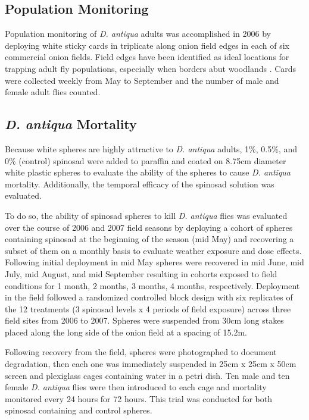 \documentclass[num-refs]{wiley-article}
\begin{document}
\subsection{Population Monitoring}

Population monitoring of \textit{D. antiqua} adults was accomplished in 2006 by deploying white sticky cards in triplicate along onion field edges in each of six commercial onion fields.  Field edges have been identified as ideal locations for trapping adult fly populations, especially when borders abut woodlands \citep{werling2006spatial}.  Cards were collected weekly from May to September and the number of male and female adult flies counted.

\subsection{\textit{D. antiqua} Mortality}

Because white spheres are highly attractive to \textit{D. antiqua} adults, 1\%, 0.5\%, and 0\% (control) spinosad were added to paraffin and coated on 8.75cm diameter white plastic spheres to evaluate the ability of the spheres to cause \textit{D. antiqua} mortality. Additionally, the temporal efficacy of the spinosad solution was evaluated.

To do so, the ability of spinosad spheres to kill \textit{D. antiqua} flies was evaluated over the course of 2006 and 2007 field seasons by deploying a cohort of spheres containing spinosad at the beginning of the season (mid May) and recovering a subset of them on a monthly basis to evaluate weather exposure and dose effects.  Following initial deployment in mid May spheres were recovered in mid June, mid July, mid August, and mid September resulting in cohorts exposed to field conditions for 1 month, 2 months, 3 months, 4 months, respectively. Deployment in the field followed a randomized controlled block design with six replicates of the 12 treatments (3 spinosad levels x 4 periods of field exposure) across three field sites from 2006 to 2007.  Spheres were suspended from 30cm long stakes placed along the long side of the onion field at a spacing of 15.2m.  

Following recovery from the field, spheres were photographed to document degradation, then each one was immediately suspended in 25cm x 25cm x 50cm screen and plexiglass cages containing water in a petri dish. Ten male and ten female \textit{D. antiqua} flies were then introduced to each cage and mortality monitored every 24 hours for 72 hours. This trial was conducted for both spinosad containing and control spheres. 
 
\end{document}
